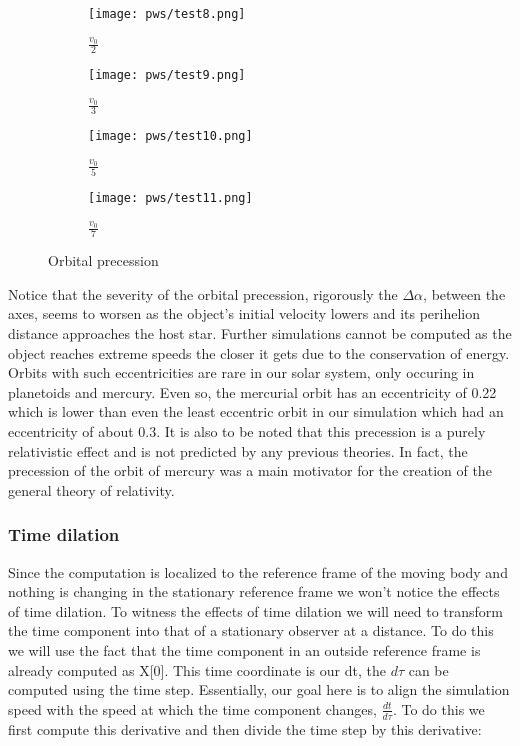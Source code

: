 \documentclass{article}
\begin{document}
\begin{figure}[h!]
  \centering
  \begin{subfigure}[h!]{0.4\linewidth}
    \texttt{[image: pws/test8.png]}
    \caption{$\frac{v_0}{2}$}
  \end{subfigure}  
  \begin{subfigure}[h!]{0.4\linewidth}
    \texttt{[image: pws/test9.png]}
    \caption{$\frac{v_0}{3}$}
  \end{subfigure}  
  \begin{subfigure}[h!]{0.4\linewidth}
    \texttt{[image: pws/test10.png]}
    \caption{$\frac{v_0}{5}$}
  \end{subfigure}  
  \begin{subfigure}[h!]{0.4\linewidth}
    \texttt{[image: pws/test11.png]}
    \caption{$\frac{v_0}{7}$}
  \end{subfigure}  
  \caption{Orbital precession}
  \label{fig:test3}
\end{figure}

Notice that the severity of the orbital precession, rigorously the $\Delta \alpha$, between the axes, seems to worsen as the object's initial velocity lowers and its perihelion distance approaches the host star. Further simulations cannot be computed as the object reaches extreme speeds the closer it gets due to the conservation of energy. Orbits with such eccentricities are rare in our solar system, only occuring in planetoids and mercury. Even so, the mercurial orbit has an eccentricity of 0.22 which is lower than even the least eccentric orbit in our simulation which had an eccentricity of about 0.3.  It is also to be noted that this precession is a purely relativistic effect and is not predicted by any previous theories. In fact, the precession of the orbit of mercury was a main motivator for the creation of the general theory of relativity.

\subsubsection{Time dilation}

Since the computation is localized to the reference frame of the moving body and nothing is changing in the stationary reference frame we won't notice the effects of time dilation. To witness the effects of time dilation we will need to transform the time component into that of a stationary observer at a distance. To do this we will use the fact that the time component in an outside reference frame is already computed as X[0]. This time coordinate is our dt, the $d\tau$ can be computed using the time step. Essentially, our goal here is to align the simulation speed with the speed at which the time component changes, $\frac{dt}{d\tau}$. To do this we first compute this derivative and then divide the time step by this derivative:
\end{document}

